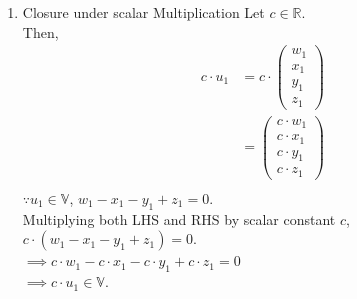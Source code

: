 \documentclass[12pt,letterpaper,fleqn]{article}
\theoremstyle{definition}
\begin{document}
\begin{enumerate}
\item Closure under scalar Multiplication
Let $c \in \mathbb{R}$.\\
Then,
\begin{equation*}
\begin{split}
c \cdot u_1 &= c \cdot \begin{pmatrix}
w_1\\
x_1\\
y_1\\
z_1
\end{pmatrix}\\
&= \begin{pmatrix}
c \cdot w_1\\
c \cdot x_1\\
c \cdot y_1\\
c \cdot z_1
\end{pmatrix}\\
\end{split}
\end{equation*}
$\because u_1 \in \mathbb{V}$, $w_1 - x_1 - y_1 + z_1 = 0$.\\
Multiplying both LHS and RHS by scalar constant $c$,\\
$ c \cdot (w_1 - x_1 - y_1 + z_1) = 0$.\\
$ \implies c \cdot w_1 - c \cdot x_1 - c \cdot y_1 + c \cdot z_1 = 0$\\
$ \implies c \cdot u_1 \in \mathbb{V}$.


\end{enumerate}
\end{document}
